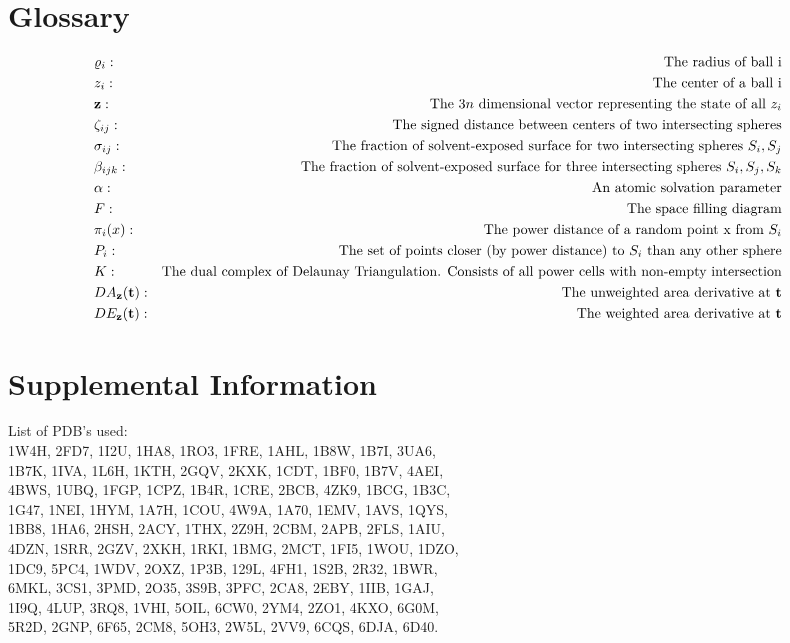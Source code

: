 \documentclass{article}
\begin{document}
\section{Glossary}
\begin{align*}
&\varrho_i:&\text{The radius of ball i} \\
&z_i:&\text{The center of a ball i} \\
&{\bf z}:&\text{The $3n$ dimensional vector representing the state of all $z_i$} \\
&\zeta_{ij}:&\text{The signed distance between centers of two intersecting spheres} \\
&\sigma_{ij}:&\text{The fraction of solvent-exposed surface for two intersecting spheres $S_i,S_j$} \\
&\beta_{ijk}:&\text{The fraction of solvent-exposed surface for three intersecting spheres $S_i,S_j, S_k$} \\
&\alpha:&\text{An atomic solvation parameter} \\
&F:&\text{The space filling diagram} \\
&\pi_i(x):&\text{The power distance of a random point x from $S_i$} \\
&P_i:&\text{The set of points closer (by power distance) to $S_i$ than any other sphere} \\
&K:&\text{The dual complex of Delaunay Triangulation. Consists of all power cells with non-empty intersection} \\
&DA_{\bf z}({\bf t}):&\text{The unweighted area derivative at \textbf{t}} \\
&DE_{\bf z}({\bf t}):&\text{The weighted area derivative at \textbf{t}} \\
\end{align*}

\section{Supplemental Information}
List of PDB's used: \\
1W4H, 2FD7, 1I2U, 1HA8, 1RO3, 1FRE, 1AHL, 1B8W, 1B7I, 3UA6,\\
1B7K, 1IVA, 1L6H, 1KTH, 2GQV, 2KXK, 1CDT, 1BF0, 1B7V, 4AEI,\\
4BWS, 1UBQ, 1FGP, 1CPZ, 1B4R, 1CRE, 2BCB, 4ZK9, 1BCG, 1B3C,\\
1G47, 1NEI, 1HYM, 1A7H, 1COU, 4W9A, 1A70, 1EMV, 1AVS, 1QYS,\\
1BB8, 1HA6, 2HSH, 2ACY, 1THX, 2Z9H, 2CBM, 2APB, 2FLS, 1AIU,\\
4DZN, 1SRR, 2GZV, 2XKH, 1RKI, 1BMG, 2MCT, 1FI5, 1WOU, 1DZO,\\
1DC9, 5PC4, 1WDV, 2OXZ, 1P3B, 129L, 4FH1, 1S2B, 2R32, 1BWR,\\
6MKL, 3CS1, 3PMD, 2O35, 3S9B, 3PFC, 2CA8, 2EBY, 1IIB, 1GAJ,\\
1I9Q, 4LUP, 3RQ8, 1VHI, 5OIL, 6CW0, 2YM4, 2ZO1, 4KXO, 6G0M,\\
5R2D, 2GNP, 6F65, 2CM8, 5OH3, 2W5L, 2VV9, 6CQS, 6DJA, 6D40.
\end{document}
